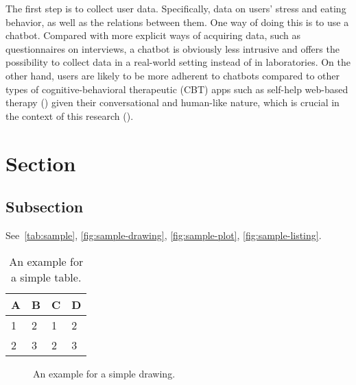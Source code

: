 \noindent The first step is to collect user data. Specifically, data on users’ stress and eating behavior, as well as the relations between them. One way of doing this is to use a chatbot. Compared with more explicit ways of acquiring data, such as questionnaires on interviews, a chatbot is obviously less intrusive and offers the possibility to collect data in a real-world setting instead of in laboratories. On the other hand, users are likely to be more adherent to chatbots compared to other types of cognitive-behavioral therapeutic (CBT) apps such as self-help web-based therapy (\cite{6_cbt}) given their conversational and human-like nature, which is crucial in the context of this research (\cite{7_woebot}).

\section{Section}

\subsection{Subsection}

See~\autoref{tab:sample}, \autoref{fig:sample-drawing}, \autoref{fig:sample-plot}, \autoref{fig:sample-listing}.

\begin{table}[htpb]
  \caption[Example table]{An example for a simple table.}\label{tab:sample}
  \centering
  \begin{tabular}{l l l l}
    \toprule
      A & B & C & D \\
    \midrule
      1 & 2 & 1 & 2 \\
      2 & 3 & 2 & 3 \\
    \bottomrule
  \end{tabular}
\end{table}

\begin{figure}[htpb]
  \centering
  \caption[Example drawing]{An example for a simple drawing.}\label{fig:sample-drawing}
\end{figure}

